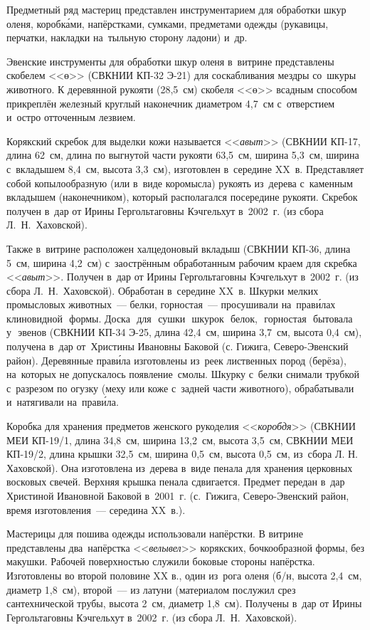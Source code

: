 Предметный ряд мастериц представлен инструментарием для обработки шкур оленя, коробк\'{а}ми, напёрстками, сумками, предметами одежды (рукавицы, перчатки, накладки на~тыльную сторону ладони) и~др.

Эвенские инструменты для обработки шкур оленя в~витрине представлены скобелем <<ө>> (СВКНИИ КП-32 Э-21) для соскабливания мездры со~шкуры животного. К деревянной рукояти (28,5~см) скобеля <<ө>> всадным способом прикреплён железный круглый наконечник диаметром 4,7~см с~отверстием и~остро отточенным лезвием.

Корякский скребок для выделки кожи называется <<\textit{авыт}>> (СВКНИИ КП-17, длина 62~см, длина по выгнутой части рукояти 63,5~см, ширина 5,3~см, ширина с~вкладышем 8,4~см, высота 3,3~см), изготовлен в~середине XX~в. Представляет собой копылообразную (или в~виде коромысла) рукоять из~дерева с~каменным вкладышем (наконечником), который располагался посередине рукояти. Скребок получен в~дар от Ирины Гергольтаговны Кэчгельхут в~2002~г. (из сбора Л.~Н.~Хаховской).

Также в~витрине расположен халцедоновый вкладыш (СВКНИИ КП-36, длина 5~см, ширина 4,2~см) с~заострённым обработанным рабочим краем для скребка <<\textit{авыт}>>. Получен в~дар от Ирины Гергольтаговны Кэчгельхут в~2002~г. (из сбора Л.~Н.~Хаховской). Обработан в~середине XX~в.
\clearpage
Шкурки мелких промысловых животных~--- белки, горностая~--- просушивали на~прав\'{и}лах клиновидной\,\,\,\,формы. Доска\,\,\,\,для\,\,\,\,сушки\,\,\,\,шкурок\,\,\,\,белок,\,\,\,\,горностая\,\,\,\,бытовала\,\,\,\,у\,\,\,\,эвенов (СВКНИИ КП-34 Э-25, длина 42,4~см, ширина 3,7~см, высота 0,4~см), получена в~дар от~Христины Ивановны Баковой (с. Гижига, Северо-Эвенский район). Деревянные прав\'{и}ла изготовлены из~реек лиственных пород (берёза), на~которых не допускалось появление~смолы. Шкурку с~белки снимали трубкой с~разрезом по огузку (меху или коже с~задней части животного), обрабатывали и~натягивали на~прав\'{и}ла.

Коробка для хранения предметов женского рукоделия <<\textit{коробдя}>> (СВКНИИ МЕИ КП-19/1, длина 34,8~см, ширина 13,2~см, высота 3,5~см, СВКНИИ МЕИ КП-19/2, длина крышки 32,5~см, ширина 0,5~см, высота 0,5~см, из~сбора Л. Н. Хаховской). Она изготовлена из~дерева в~виде пенала для хранения церковных восковых свечей. Верхняя крышка пенала сдвигается. Предмет передан в~дар Христиной Ивановной Баковой в~2001~г. (с.~Гижига, Северо-Эвенский район, время изготовления~--- середина XX~в.).

Мастерицы для пошива одежды использовали напёрстки. В витрине представлены два~напёрстка <<\textit{велывел}>> корякских, бочкообразной формы, без макушки. Рабочей поверхностью служили боковые стороны напёрстка. Изготовлены во второй половине XX в., один из~рога оленя (б/н, высота 2,4~см, диаметр 1,8~см), второй~--- из латуни (материалом послужил срез сантехнической трубы, высота 2~см, диаметр 1,8~см). Получены в~дар от Ирины Гергольтаговны Кэчгельхут в~2002~г. (из сбора Л.~Н.~Хаховской).

